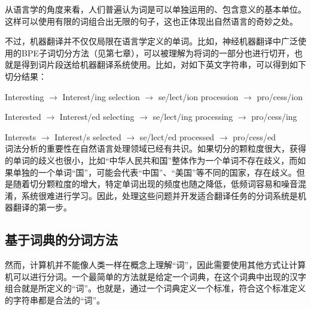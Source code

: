 \parinterval 从语言学的角度来看，人们普遍认为词是可以单独运用的、包含意义的基本单位。这样可以使用有限的词组合出无限的句子，这也正体现出自然语言的奇妙之处。

\parinterval 不过，机器翻译并不仅仅局限在语言学定义的单词。比如，神经机器翻译中广泛使用的BPE子词切分方法（见第七章），可以被理解为将词的一部分也进行切开，也就是得到词片段送给机器翻译系统使用。比如，对如下英文字符串，可以得到如下切分结果：

\newpage
\parinterval Interesting \; $\to$ \; Interest/ing  selection \hspace{0.08em} $\to$ \;se/lect/ion  procession \hspace{0.43em} $\to$ \; pro/cess/ion

\parinterval Interested \hspace{0.62em} $\to$ \; Interest/ed   selecting \hspace{0.34em} $\to$ \; se/lect/ing  processing \hspace{0.22em} $\to$ \; pro/cess/ing

\parinterval Interests \hspace{1.17em} $\to$ \; Interest/s   selected \hspace{1.24em} $\to$ \; se/lect/ed   processed \hspace{0.82em} $\to$ \; pro/cess/ed \\


\parinterval 词法分析的重要性在自然语言处理领域已经有共识。如果切分的颗粒度很大，获得的单词的歧义也很小，比如``中华人民共和国''整体作为一个单词不存在歧义，而如果单独的一个单词``国''，可能会代表``中国''、``美国''等不同的国家，存在歧义。但是随着切分颗粒度的增大，特定单词出现的频度也随之降低，低频词容易和噪音混淆，系统很难进行学习。因此，处理这些问题并开发适合翻译任务的分词系统是机器翻译的第一步。


\subsection{基于词典的分词方法}
\parinterval 然而，计算机并不能像人类一样在概念上理解``词''，因此需要使用其他方式让计算机可以进行分词。一个最简单的方法就是给定一个词典，在这个词典中出现的汉字组合就是所定义的``词''。也就是，通过一个词典定义一个标准，符合这个标准定义的字符串都是合法的``词''。

